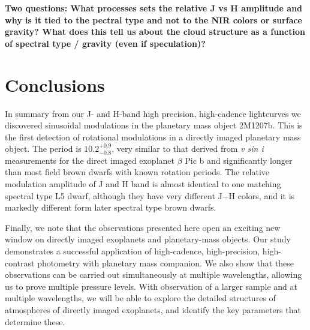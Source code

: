 \documentclass[apj]{emulateapj}
\newcommand{\bpic}{$\beta$ Pic}
\begin{document}
{\bf Two questions: What processes sets the relative J vs H amplitude
  and why is it tied to the pectral type and not to the NIR colors or
  surface gravity? What does this tell us about the cloud structure
  as a function of spectral type / gravity (even if speculation)?}

\section{Conclusions}
In summary from our J- and H-band high precision,
high-cadence lightcurves we discovered sinusoidal modulations in the  planetary mass object
2M1207b. This is the first detection of rotational modulations in a
directly imaged planetary mass object.  
The period is  $10.2^{+0.9}_{-0.8}$, very similar to that derived from
{\em v sin i} measurements for  the direct imaged exoplanet \bpic{} b and significantly longer than
most field brown dwarfs with known rotation periods. The
relative modulation amplitude of J and H band is almost identical to
one matching spectral type L5 dwarf, although they have very different
J$-$H colors, and it is markedly different form later spectral type
brown dwarfs.

Finally, we note that the observations presented here open an exciting
new window on directly imaged exoplanets and planetary-mass
objects. Our study demonstrates a successful application of high-cadence,
high-precision, high-contrast photometry with planetary mass
companion. We also show that these observations can be carried out simultaneously
at multiple wavelengths, allowing us to prove multiple pressure
levels. With observation of a larger sample and at multiple wavelengths, we will be
able to explore  the detailed structures of atmospheres of directly
imaged exoplanets, and identify the key parameters that determine these.



\end{document}
